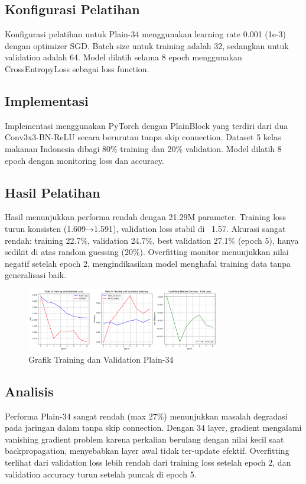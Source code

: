 \documentclass[11pt,a4paper]{article}
\begin{document}
\subsection{Konfigurasi Pelatihan}
Konfigurasi pelatihan untuk Plain-34 menggunakan learning rate 0.001 (1e-3) dengan optimizer SGD. Batch size untuk training adalah 32, sedangkan untuk validation adalah 64. Model dilatih selama 8 epoch menggunakan CrossEntropyLoss sebagai loss function.

\subsection{Implementasi}
Implementasi menggunakan PyTorch dengan PlainBlock yang terdiri dari dua Conv3x3-BN-ReLU secara berurutan tanpa skip connection. Dataset 5 kelas makanan Indonesia dibagi 80\% training dan 20\% validation. Model dilatih 8 epoch dengan monitoring loss dan accuracy.

\subsection{Hasil Pelatihan}
Hasil menunjukkan performa rendah dengan 21.29M parameter. Training loss turun konsisten (1.609→1.591), validation loss stabil di ~1.57. Akurasi sangat rendah: training 22.7\%, validation 24.7\%, best validation 27.1\% (epoch 5), hanya sedikit di atas random guessing (20\%). Overfitting monitor menunjukkan nilai negatif setelah epoch 2, mengindikasikan model menghafal training data tanpa generalisasi baik.
\begin{figure}[h]
\centering
\includegraphics[width=0.75\textwidth]{Figure/plainnet34.png}
\caption{Grafik Training dan Validation Plain-34}
\label{fig:plain34}
\end{figure}

\subsection{Analisis}
Performa Plain-34 sangat rendah (max 27\%) menunjukkan masalah degradasi pada jaringan dalam tanpa skip connection. 
Dengan 34 layer, gradient mengalami vanishing gradient problem karena perkalian berulang dengan nilai kecil saat backpropagation, 
menyebabkan layer awal tidak ter-update efektif. Overfitting terlihat dari validation loss lebih rendah dari training loss setelah epoch 2, 
dan validation accuracy turun setelah puncak di epoch 5.
\end{document}
